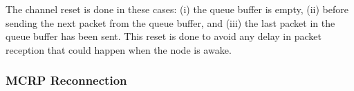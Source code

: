 The channel reset is done in these cases: (i) the queue buffer is empty, (ii) before sending the next packet from the queue buffer, and (iii) the last packet in the queue buffer has been sent. This reset is done to avoid any delay in packet reception that could happen when the node is awake.

\subsubsection{MCRP Reconnection}

\begin{figure}
\centering
{}        
\hfill        

\end{figure}
